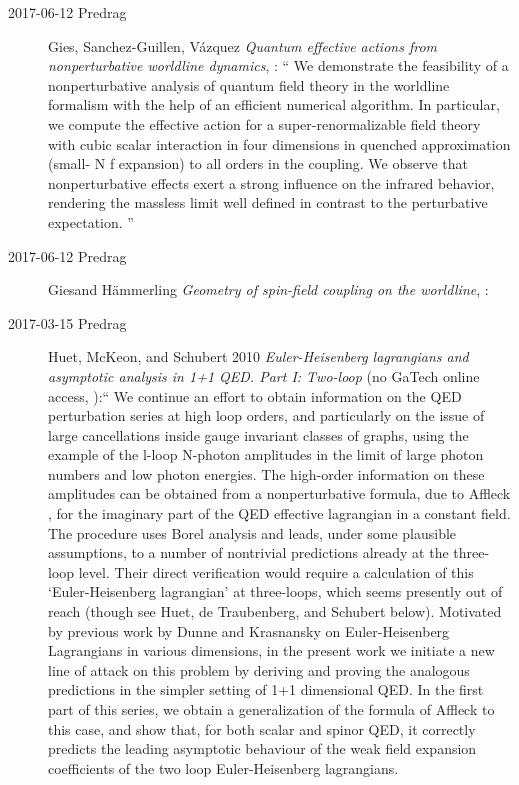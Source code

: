 \begin{description}
\item[2017-06-12 Predrag]
Gies, Sanchez-Guillen, V{\'a}zquez
{\em Quantum effective actions from nonperturbative worldline dynamics},
 : ``
We demonstrate the feasibility of a nonperturbative analysis of quantum
field theory in the worldline formalism with the help of an efficient
numerical algorithm. In particular, we compute the effective action for a
super-renormalizable field theory with cubic scalar interaction in four
dimensions in quenched approximation (small- N f expansion) to all orders
in the coupling. We observe that nonperturbative effects exert a strong
influence on the infrared behavior, rendering the massless limit well
defined in contrast to the perturbative expectation.
''

\item[2017-06-12 Predrag]
Giesand H{\"a}mmerling
{\em Geometry of spin-field coupling on the worldline},
:

\item[2017-03-15 Predrag]
Huet, McKeon, and Schubert 2010
{\em {Euler-Heisenberg} lagrangians and asymptotic analysis in 1+1 {QED. Part I: Two}-loop}
(no GaTech online access, ):``
We continue an effort to obtain information on the QED perturbation
series at high loop orders, and particularly on the issue of large
cancellations inside gauge invariant classes of graphs, using the example
of the l-loop N-photon amplitudes in the limit of large photon
numbers and low photon energies. The high-order
information on these amplitudes can be obtained from a nonperturbative
formula, due to Affleck \etal{}, for the imaginary part of the QED
effective lagrangian in a constant field. The procedure uses Borel
analysis and leads, under some plausible assumptions, to a number of
nontrivial predictions already at the three-loop level. Their direct
verification would require a calculation of this `Euler-Heisenberg
lagrangian' at three-loops, which seems presently out of reach
(though see Huet, de Traubenberg, and Schubert below). Motivated
by previous work by Dunne and Krasnansky on Euler-Heisenberg
Lagrangians in various dimensions, in the present work we initiate a new
line of attack on this problem by deriving and proving the analogous
predictions in the simpler setting of 1+1 dimensional QED. In the first
part of this series, we obtain a generalization of the formula of
Affleck \etal{}
to this case, and show that, for both scalar and spinor QED, it
correctly predicts the leading asymptotic behaviour of the weak field
expansion coefficients of the two loop Euler-Heisenberg lagrangians.


\end{description}
